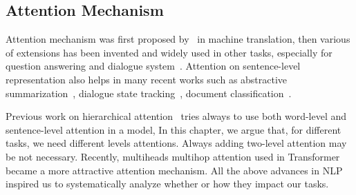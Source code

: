 \subsection{Attention Mechanism}
\label{ssec:sentential:attention}

Attention mechanism was first proposed by~\citet{bahdanau2014neural}
in machine translation, then various of extensions has been invented
and widely used in other tasks, especially for question answering and
dialogue
system~\citep{matchlstm,bidaf,sukhbaatar15mnet,fei17gmnet,P18-1157}.
Attention on sentence-level representation also helps in many recent
works such as abstractive summarization~\citep{P18-1013}, dialogue
state tracking~\citep{zhou2018multi,zhou2016multi}, document
classification~\citep{yang2016hierarchical}.

Previous work on hierarchical attention~\citep{yang2016hierarchical}
tries always to use both word-level and sentence-level attention in a
model, In this chapter, we argue that, for different tasks, we need
different levels attentions. Always adding two-level attention may be
not necessary. Recently, multiheads multihop attention used in
Transformer~\citep{NIPS2017_7181} became a more attractive attention
mechanism. All the above advances in NLP inspired us to systematically
analyze whether or how they impact our tasks.

